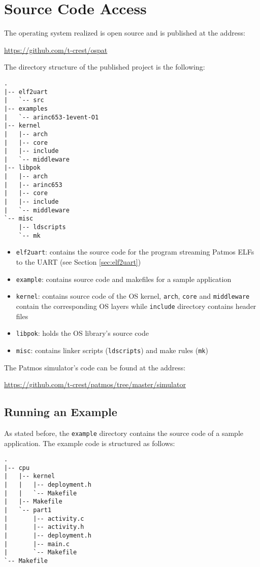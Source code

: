 \chapter{Source Code Access}

The operating system realized is open source and is published at the address:

\hfill{}\url{https://github.com/t-crest/ospat}\hfill{}

The directory structure of the published project is the following:

\begin{verbatim}
.
|-- elf2uart
|   `-- src
|-- examples
|   `-- arinc653-1event-O1
|-- kernel
|   |-- arch
|   |-- core
|   |-- include
|   `-- middleware
|-- libpok
|   |-- arch
|   |-- arinc653
|   |-- core
|   |-- include
|   `-- middleware
`-- misc
    |-- ldscripts
    `-- mk
\end{verbatim}

\begin{itemize}
	\item \texttt{elf2uart}: contains the source code for the program streaming Patmos ELFs to the UART (see Section \ref{sec:elf2uart})
	\item \texttt{example}: contains source code and makefiles for a sample application
	\item \texttt{kernel}: contains source code of the OS kernel, \texttt{arch}, \texttt{core} and \texttt{middleware} contain the corresponding OS layers while \texttt{include} directory contains header files
	\item \texttt{libpok}: holds the OS library's source code
	\item \texttt{misc}: contains linker scripts (\texttt{ldscripts}) and make rules (\texttt{mk})
\end{itemize}

The Patmos simulator's code can be found at the address:

\hfill{}\url{https://github.com/t-crest/patmos/tree/master/simulator}\hfill{}

\section{Running an Example}

As stated before, the \texttt{example} directory contains the source code of a sample application. The example code is structured as follows:

\begin{verbatim}
.
|-- cpu
|   |-- kernel
|   |   |-- deployment.h
|   |   `-- Makefile
|   |-- Makefile
|   `-- part1
|       |-- activity.c
|       |-- activity.h
|       |-- deployment.h
|       |-- main.c
|       `-- Makefile
`-- Makefile
\end{verbatim}

